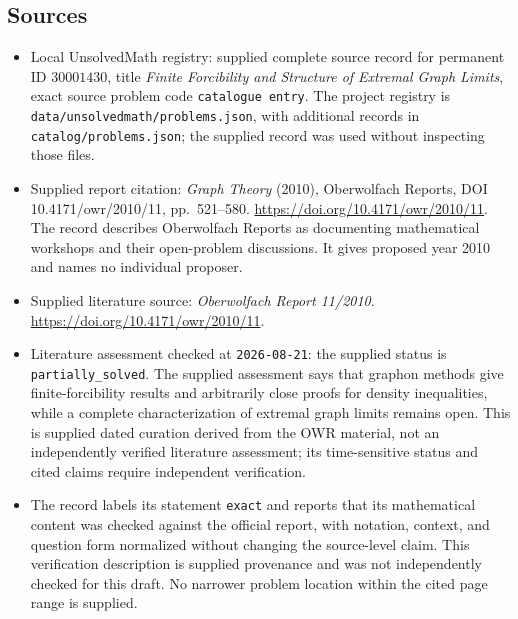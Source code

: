 \documentclass[11pt]{article}
\begin{document}
\subsection{Sources}
\begin{itemize}
\item Local UnsolvedMath registry: supplied complete source record for permanent ID \(30001430\), title \emph{Finite Forcibility and Structure of Extremal Graph Limits}, exact source problem code \texttt{catalogue entry}. The project registry is \texttt{data/unsolvedmath/problems.json}, with additional records in \texttt{catalog/problems.json}; the supplied record was used without inspecting those files.
\item Supplied report citation: \emph{Graph Theory} (2010), Oberwolfach Reports, DOI 10.4171/owr/2010/11, pp.~521--580. \url{https://doi.org/10.4171/owr/2010/11}. The record describes Oberwolfach Reports as documenting mathematical workshops and their open-problem discussions. It gives proposed year 2010 and names no individual proposer.
\item Supplied literature source: \emph{Oberwolfach Report 11/2010}. \url{https://doi.org/10.4171/owr/2010/11}.
\item Literature assessment checked at \texttt{2026-08-21}: the supplied status is \texttt{partially\_solved}. The supplied assessment says that graphon methods give finite-forcibility results and arbitrarily close proofs for density inequalities, while a complete characterization of extremal graph limits remains open. This is supplied dated curation derived from the OWR material, not an independently verified literature assessment; its time-sensitive status and cited claims require independent verification.
\item The record labels its statement \texttt{exact} and reports that its mathematical content was checked against the official report, with notation, context, and question form normalized without changing the source-level claim. This verification description is supplied provenance and was not independently checked for this draft. No narrower problem location within the cited page range is supplied.
\end{itemize}
\end{document}
